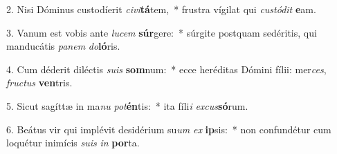 2. Nisi Dóminus custodíerit \textit{ci}\textit{vi}\textbf{tá}tem,~*  frustra vígilat qui \textit{cus}\textit{tó}\textit{dit} \textbf{e}am.\

3. Vanum est vobis ante \textit{lu}\textit{cem} \textbf{súr}gere:~*  súrgite postquam sedéritis, qui manducátis \textit{pa}\textit{nem} \textit{do}\textbf{ló}ris.\

4. Cum déderit diléctis \textit{su}\textit{is} \textbf{som}num:~*  ecce heréditas Dómini fílii: mer\textit{ces}, \textit{fruc}\textit{tus} \textbf{ven}tris.\

5. Sicut sagíttæ in ma\textit{nu} \textit{pot}\textbf{én}tis:~*  ita fíli\textit{i} \textit{ex}\textit{cus}\textbf{só}rum.\

6. Beátus vir qui implévit desidérium su\textit{um} \textit{ex} \textbf{ip}sis:~*  non confundétur cum loquétur inimícis \textit{su}\textit{is} \textit{in} \textbf{por}ta.\

